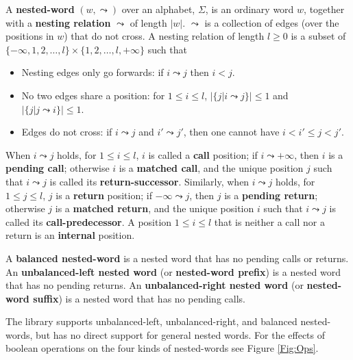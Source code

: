 \documentclass{llncs}
\begin{document}
\begin{definition}
  \label{De:nested word}

  A \textbf{nested-word} $(w,\leadsto)$ over an alphabet, $\Sigma$, is an
  ordinary word $w$, together with a \textbf{nesting relation} $\leadsto$ of
  length $|w|$.  $\leadsto$ is a collection of edges (over the positions in
  $w$) that do not cross.  A nesting relation of length $l \geq 0$ is a
  subset of $\{-\infty,1,2,\ldots,l\} \times \{1,2,\ldots,l,+\infty\}$ such
  that

  \begin{itemize}
    \item Nesting edges only go forwards: if $i \leadsto j$ then $i < j$.
    \item No two edges share a position: for $1 \leq i \leq l$, $|\{j | i
      \leadsto j \}| \leq 1$ and $|\{ j | j \leadsto i \}| \leq 1$.
    \item Edges do not cross: if $i \leadsto j$ and $i' \leadsto j'$, then
      one cannot have $i < i' \leq j < j'$.
  \end{itemize}

  When $i \leadsto j$ holds, for $1 \leq i \leq l$, $i$ is called a
  \textbf{call} position; if $i \leadsto +\infty$, then $i$ is a
  \textbf{pending call}; otherwise $i$ is a \textbf{matched call}, and the
  unique position $j$ such that $i \leadsto j$ is called its
  \textbf{return-successor}.  Similarly, when $i \leadsto j$ holds, for $1
  \leq j \leq l$, $j$ is a \textbf{return} position; if $-\infty \leadsto j$,
  then $j$ is a \textbf{pending return}; otherwise $j$ is a \textbf{matched
    return}, and the unique position $i$ such that $i \leadsto j$ is called
  its \textbf{call-predecessor}.  A position $1 \leq i \leq l$ that is
  neither a call nor a return is an \textbf{internal} position.

  A \textbf{balanced nested-word} is a nested word that has no pending calls
  or returns.  An \textbf{unbalanced-left nested word} (or
  \textbf{nested-word prefix}) is a nested word that has no pending returns.
  An \textbf{unbalanced-right nested word} (or \textbf{nested-word suffix})
  is a nested word that has no pending calls.

\end{definition}

The library supports unbalanced-left, unbalanced-right, and balanced
nested-words, but has no direct support for general nested words.  For the
effects of boolean operations on the four kinds of nested-words see Figure
\ref{Fig:Ops}.
\end{document}
